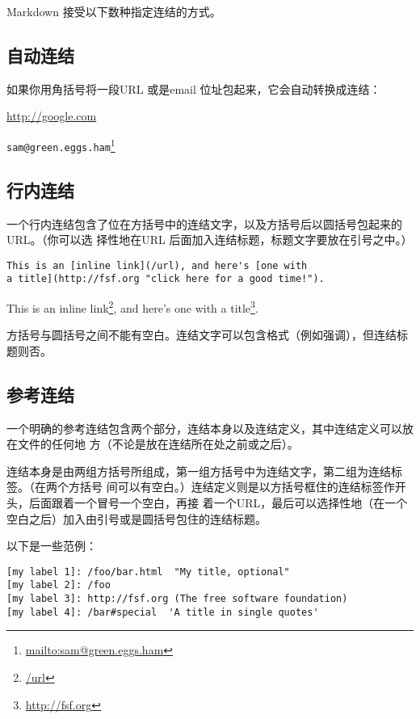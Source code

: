 \documentclass[fancyhdr,bookmark]{ctexbook}
\renewcommand{\href}[2]{#2\footnote{\url{#1}}}
\begin{document}
Markdown 接受以下数种指定连结的方式。

\subsection{自动连结}\label{ux81eaux52a8ux8fdeux7ed3}

如果你用角括号将一段URL 或是email 位址包起来，它会自动转换成连结：

\url{http://google.com}

\href{mailto:sam@green.eggs.ham}{\nolinkurl{sam@green.eggs.ham}}

\subsection{行内连结}\label{ux884cux5185ux8fdeux7ed3}

一个行内连结包含了位在方括号中的连结文字，以及方括号后以圆括号包起来的URL。（你可以选
择性地在URL 后面加入连结标题，标题文字要放在引号之中。）

\begin{lstlisting}
This is an [inline link](/url), and here's [one with
a title](http://fsf.org "click here for a good time!").
\end{lstlisting}

This is an \href{/url}{inline link}, and here's
\href{http://fsf.org}{one with a title}.

方括号与圆括号之间不能有空白。连结文字可以包含格式（例如强调），但连结标题则否。

\subsection{参考连结}\label{ux53c2ux8003ux8fdeux7ed3}

一个明确的参考连结包含两个部分，连结本身以及连结定义，其中连结定义可以放在文件的任何地
方（不论是放在连结所在处之前或之后）。

连结本身是由两组方括号所组成，第一组方括号中为连结文字，第二组为连结标签。（在两个方括号
间可以有空白。）连结定义则是以方括号框住的连结标签作开头，后面跟着一个冒号一个空白，再接
着一个URL，最后可以选择性地（在一个空白之后）加入由引号或是圆括号包住的连结标题。

以下是一些范例：

\begin{lstlisting}
[my label 1]: /foo/bar.html  "My title, optional"
[my label 2]: /foo
[my label 3]: http://fsf.org (The free software foundation)
[my label 4]: /bar#special  'A title in single quotes'
\end{lstlisting}
\end{document}

